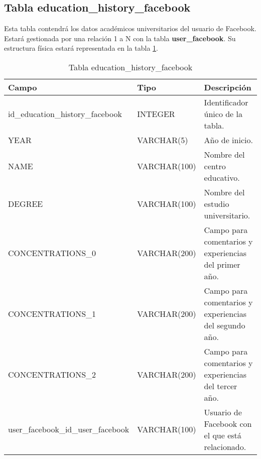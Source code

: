 \subsection{Tabla education\_history\_facebook}
Esta tabla contendrá los datos académicos universitarios del usuario de Facebook. Estará gestionada por una relación 1 a N con la tabla \textbf{user\_facebook}. Su estructura física estará representada en la tabla \ref{tabEducationHistoryFacebook}.
\bigskip
\par
\begin{table}[h]
\begin{center}
\begin{tabular}{| l | l | p{60mm} |}\hline
\textbf{Campo}&\textbf{Tipo}&\textbf{Descripción} \\ \hline
id\_education\_history\_facebook & INTEGER & Identificador único de la tabla. \\ \hline
YEAR & VARCHAR(5) & Año de inicio. \\ \hline
NAME & VARCHAR(100) &  Nombre del centro educativo.\\ \hline
DEGREE & VARCHAR(100) & Nombre del estudio universitario. \\ \hline
CONCENTRATIONS\_0 & VARCHAR(200) & Campo para comentarios y experiencias del primer año. \\ \hline
CONCENTRATIONS\_1 & VARCHAR(200) & Campo para comentarios y experiencias del segundo año. \\ \hline
CONCENTRATIONS\_2 & VARCHAR(200) & Campo para comentarios y experiencias del tercer año. \\ \hline
user\_facebook\_id\_user\_facebook & VARCHAR(100) & Usuario de Facebook con el que está relacionado. \\ \hline
\end{tabular}
\end{center}
\caption{Tabla education\_history\_facebook} \label{tabEducationHistoryFacebook}
\end{table}

